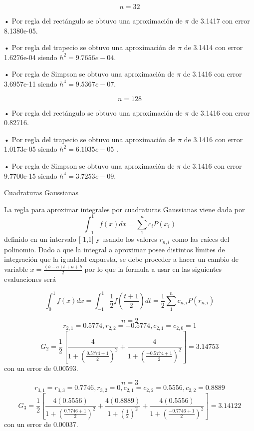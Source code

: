 \documentclass[11pt]{article}
\begin{document}
$$n = 32$$

• Por regla del rectángulo se obtuvo una aproximación de $\pi$ de 3.1417 con error 8.1380e-05.

• Por regla del trapecio se obtuvo una aproximación de $\pi$ de 3.1414 con error 1.6276e-04 siendo $h^2 = 9.7656e-04$.

• Por regla de Simpson se obtuvo una aproximación de $\pi$ de 3.1416 con error 3.6957e-11 siendo $h^4 = 9.5367e-07$.


$$n = 128$$

• Por regla del rectángulo se obtuvo una aproximación de $\pi$ de 3.1416 con error 0.82716.

• Por regla del trapecio se obtuvo una aproximación de $\pi$ de 3.1416 con error 1.0173e-05 siendo $h^2 =6.1035e-05$ .

• Por regla de Simpson se obtuvo una aproximación de $\pi$ de 3.1416 con error 9.7700e-15 siendo $h^4 = 3.7253e-09$.

\begin{center} Cuadraturas Gaussianas\end{center}

La regla para aproximar integrales por cuadraturas Gaussianas viene dada por
\begin{equation}
    \int_{-1}^{1} f(x)dx = \sum_{1}^{n}c_iP(x_i)
\end{equation}
definido en un intervalo [-1,1] y usando los valores $r_{n,i}$ como las raíces del polinomio. 
Dado a que la integral a aproximar posee distintos límites de integración que la igualdad expuesta, se debe proceder a hacer un cambio de variable $x = \frac{(b-a)t + a +b}{2}$ por lo que la formula a usar en las siguientes evaluaciones será

\begin{equation}
    \int_{0}^{1} f(x)dx = \int_{-1}^{1} \frac{1}{2}f(\frac{t+1}{2})dt =  \frac{1}{2}\sum_{1}^{n}c_{n,i}P(r_{n,i})
\end{equation}

$$n = 2$$
$$r_{2,1} = 0.5774, r_{2,2} = -0.5774, c_{2,1} = c_{2,0} = 1 $$
$$
G_2 = \frac{1}{2} [ \frac{4}{1+(\frac{0.5774+1}{2})^2} + \frac{4}{1+(\frac{-0.5774+1}{2})^2}] = 3.14753
$$
con un error de 0.00593.

$$n = 3$$
$$r_{3,1} = r_{3,3} = 0.7746, r_{3,2} = 0, c_{2,1} = c_{2,2} = 0.5556,c_{2,2} = 0.8889 $$
$$
G_3 = \frac{1}{2} [ \frac{4(0.5556)}{1+(\frac{0.7746+1}{2})^2} + \frac{4(0.8889)}{1+(\frac{1}{2})^2} +  \frac{4(0.5556)}{1+(\frac{-0.7746+1}{2})^2} ] = 3.14122
$$
con un error de 0.00037.
\end{document}

